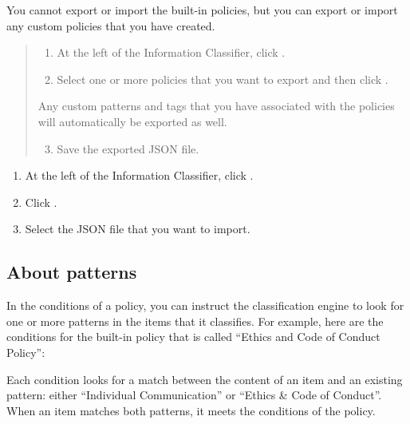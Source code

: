 \documentclass[letterpaper,10pt,english]{sphinxmanual}
\begin{document}
You cannot export or import the built-in policies, but you can export or import any custom policies that you have created.

\begin{quote}
\begin{enumerate}
\item {} 
At the left of the Information Classifier, click .

\item {} 
Select one or more policies that you want to export and then click .

\end{enumerate}

Any custom patterns and tags that you have associated with the policies will automatically be exported as well.
\begin{enumerate}
\setcounter{enumi}{2}
\item {} 
Save the exported JSON file.

\end{enumerate}
\end{quote}

\begin{enumerate}
\item {} 
At the left of the Information Classifier, click .

\item {} 
Click .

\item {} 
Select the JSON file that you want to import.

\end{enumerate}


\subsection{About patterns}
\label{\detokenize{mcdmp_app_ug:about-patterns}}
In the conditions of a policy, you can instruct the classification engine to look for one or more patterns in the items that it classifies. For example, here are the conditions for the built-in policy that is called “Ethics and Code of Conduct Policy”:

Each condition looks for a match between the content of an item and an existing pattern: either “Individual Communication” or “Ethics \& Code of Conduct”. When an item matches both patterns, it meets the conditions of the policy.
\end{document}

